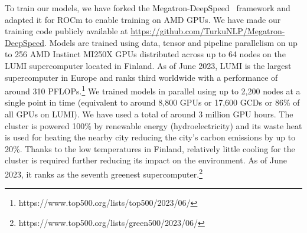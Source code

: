 \documentclass{article}
\begin{document}

To train our models, we have forked the Megatron-DeepSpeed~\cite{rasley2020deepspeed,smith2022using} framework and adapted it for ROCm to enable training on AMD GPUs. We have made our training code publicly available at \url{https://github.com/TurkuNLP/Megatron-DeepSpeed}. Models are trained using data, tensor and pipeline parallelism on up to 256 AMD Instinct MI250X GPUs distributed across up to 64 nodes on the LUMI supercomputer located in Finland. As of June 2023, LUMI is the largest supercomputer in Europe and ranks third worldwide with a performance of around 310 PFLOPs.\footnote{https://www.top500.org/lists/top500/2023/06/} We trained models in parallel using up to 2,200 nodes at a single point in time (equivalent to around 8,800 GPUs or 17,600 GCDs or 86\% of all GPUs on LUMI). We have used a total of around 3 million GPU hours. The cluster is powered 100\% by renewable energy (hydroelectricity) and its waste heat is used for heating the nearby city reducing the city's carbon emissions by up to 20\%. Thanks to the low temperatures in Finland, relatively little cooling for the cluster is required further reducing its impact on the environment. As of June 2023, it ranks as the seventh greenest supercomputer.\footnote{https://www.top500.org/lists/green500/2023/06/}
\end{document}
